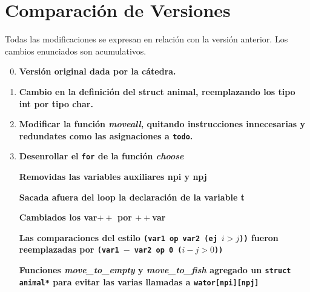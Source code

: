 \documentclass[a4paper,10pt]{article}
\begin{document}
\newpage

\section{Comparaci\'on de Versiones}

Todas las modificaciones se expresan en relaci\'on con la versi\'on anterior. Los cambios enunciados son acumulativos.

\begin{enumerate}
\setcounter{enumi}{-1}

 \item \textbf {Versi\'on original dada por la c\'atedra.}
 
 \item \textbf {Cambio en la definici\'on del struct animal, reemplazando los tipo int por tipo char.}
 
 \item \textbf {Modificar la funci\'on \textit{moveall}, quitando instrucciones innecesarias y redundates como las asignaciones a \texttt{todo}.}
 
 \item \textbf {Desenrollar el \texttt{for} de la funci\'on \textit{choose}} 
	
	\textbf {Removidas las variables auxiliares npi y npj}
	
	\textbf {Sacada afuera del loop la declaraci\'on de la variable t}
	
	\textbf {Cambiados los var$++$ por $++$var}
	
	\textbf {Las comparaciones del estilo \texttt{(var1 op var2 (ej $i > j$))} fueron reemplazadas por \texttt{(var1 $-$ var2 op 0 ($i - j > 0$))}}
	
	\textbf {Funciones \textit{move\_to\_empty} y \textit{move\_to\_fish} agregado un \texttt{struct animal*} para evitar las varias llamadas a \texttt{wator[npi][npj]}}
		

\end{enumerate}
\end{document}
